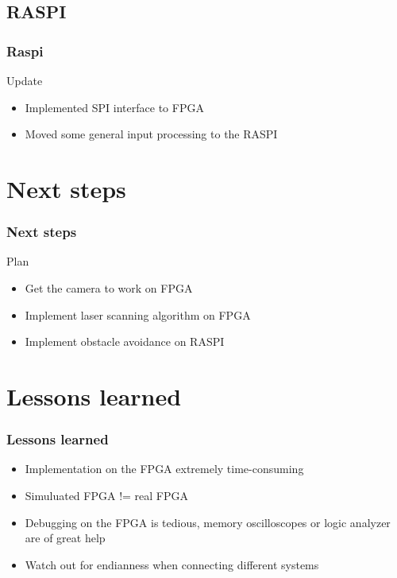 \documentclass[pdf]{beamer}
\begin{document}
\subsection{RASPI}
\begin{frame}
\frametitle{Raspi}
\begin{exampleblock}{Update}
\begin{itemize}
  \item Implemented SPI interface to FPGA
  \item Moved some general input processing to the RASPI
\end{itemize}
\end{exampleblock}
\end{frame}

\section{Next steps}
\begin{frame}
\frametitle{Next steps}
\begin{exampleblock}{Plan}
\begin{itemize}
\item Get the camera to work on FPGA 
\item Implement laser scanning algorithm on FPGA
\item Implement obstacle avoidance on RASPI 
\end{itemize}
\end{exampleblock}
\end{frame}

\section{Lessons learned}
\begin{frame}
\frametitle{Lessons learned}
\begin{exampleblock}{}
\begin{itemize}
\item Implementation on the FPGA extremely time-consuming
\item Simuluated FPGA  != real FPGA
\item Debugging on the FPGA is tedious, memory oscilloscopes or logic analyzer are of great help  
\item Watch out for endianness when connecting different systems
\end{itemize}
\end{exampleblock}
\end{frame}
\end{document}
